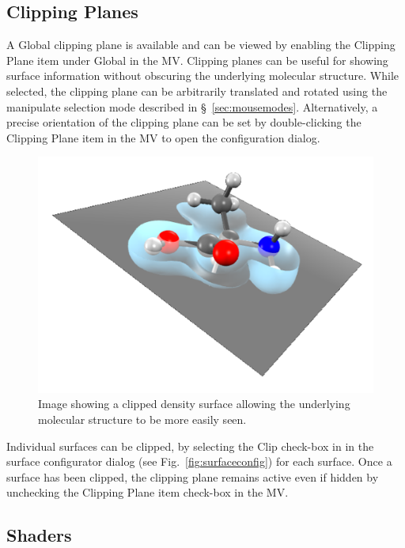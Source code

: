 \documentclass[a4paper,12pt]{article}
\begin{document}
\subsection{Clipping Planes}

A Global clipping plane is available and can be viewed by enabling the Clipping
Plane item under Global in the MV.  Clipping planes can be useful for showing
surface information without obscuring the underlying molecular structure.
While selected, the clipping plane can be arbitrarily translated and rotated
using the manipulate selection mode described in \S\ \ref{sec:mousemodes}.
Alternatively, a precise orientation of the clipping plane can be set by
double-clicking the Clipping Plane item in the MV to open the configuration
dialog.

\begin{figure}[h]
\begin{center}
\includegraphics[scale=0.30]{figures/ClippingPlane.png}
\caption{Image showing a clipped density surface allowing the underlying
molecular structure to be more easily seen.} 
\end{center}
\end{figure}

Individual surfaces can be clipped, by selecting the Clip check-box in in the
surface configurator dialog (see Fig.~\ref{fig:surfaceconfig}) for each
surface.  Once a surface has been clipped, the clipping plane remains active
even if hidden by unchecking the Clipping Plane item check-box in the MV.


\subsection{Shaders}
\end{document}
